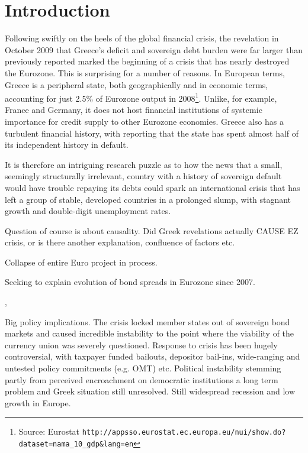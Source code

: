 \documentclass[/../base.tex]{subfiles}
\begin{document}
\section{Introduction}
\label{intro}

Following swiftly on the heels of the global financial crisis, the revelation in October 2009 that Greece's deficit and sovereign debt burden were far larger than previously reported marked the beginning of a crisis  that has nearly destroyed the Eurozone. This is surprising for a number of reasons. In European terms, Greece is a peripheral state, both geographically and in economic terms, accounting for just 2.5\% of Eurozone output in 2008\footnote{Source: Eurostat \texttt{http://appsso.eurostat.ec.europa.eu/nui/show.do?dataset=nama\_10\_gdp\&lang=en}}. Unlike, for example, France and Germany, it does not host financial institutions of systemic importance for credit supply to other Eurozone economies. Greece also has a turbulent financial history, with \cite{kalyvas2015modern} reporting that the state has spent almost half of its independent history in default.

It is therefore an intriguing research puzzle as to how the news that a small, seemingly structurally irrelevant, country with a history of sovereign default  would have trouble repaying its debts could spark an international crisis that has left a group of stable, developed countries in a prolonged slump, with stagnant growth and double-digit unemployment rates.

Question of course is about causality. Did Greek revelations actually CAUSE EZ crisis, or is there another explanation, confluence of factors etc.

Collapse of entire Euro project in process.

Seeking to explain evolution of bond spreads in Eurozone since 2007.

\cite{whelan2013sovereign}, \cite{obstfeld1997destabilizing}

Big policy implications. The crisis locked member states out of sovereign bond markets and caused incredible instability to the point where the viability of the currency union was severely questioned. Response to crisis has been hugely controversial, with taxpayer funded bailouts, depositor bail-ins, wide-ranging and untested policy commitments (e.g. OMT) etc. Political instability stemming partly from perceived encroachment on democratic institutions a long term problem and Greek situation still unresolved. Still widespread recession and low growth in Europe.  
\end{document}
